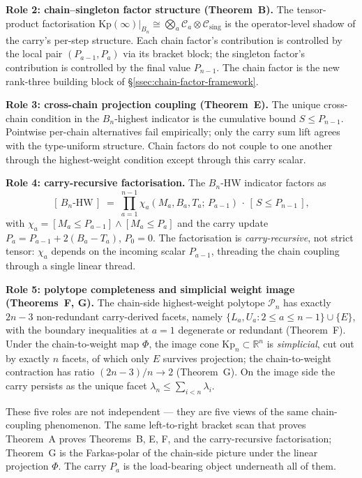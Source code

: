 \documentclass[11pt]{article}
\theoremstyle{definition}
\theoremstyle{remark}
\newcommand{\Kp}{\mathrm{Kp}}
\newcommand{\Cmid}{\mathcal{C}}
\newcommand{\Csing}{\mathcal{C}_{\mathrm{sing}}}
\newcommand{\Pn}{\mathcal{P}}
\begin{document}
\medskip
\noindent\textbf{Role 2: chain--singleton factor structure (Theorem~B).} The tensor-product
factorisation $\Kp(\infty)|_{B_n} \cong \bigotimes_a \Cmid_a \otimes \Csing$ is the
operator-level shadow of the carry's per-step structure. Each chain factor's contribution is
controlled by the local pair $(P_{a - 1}, P_a)$ via its bracket block; the singleton factor's
contribution is controlled by the final value $P_{n - 1}$. The chain factor is the new
rank-three building block of \S\ref{ssec:chain-factor-framework}.

\medskip
\noindent\textbf{Role 3: cross-chain projection coupling (Theorem~E).} The unique cross-chain
condition in the $B_n$-highest indicator is the cumulative bound $S \le P_{n - 1}$. Pointwise
per-chain alternatives fail empirically; only the carry sum lift agrees with the type-uniform
structure. Chain factors do not couple to one another through the highest-weight condition
except through this carry scalar.

\medskip
\noindent\textbf{Role 4: carry-recursive factorisation.} The $B_n$-HW indicator factors as
\[
   [\,B_n\text{-HW}\,] \;=\; \prod_{a = 1}^{n - 1} \chi_a(M_a, B_a, T_a;\, P_{a - 1})
   \,\cdot\, [\,S \le P_{n - 1}\,],
\]
with $\chi_a = [M_a \le P_{a - 1}] \wedge [M_a \le P_a]$ and the carry update $P_a = P_{a - 1}
+ 2(B_a - T_a)$, $P_0 = 0$. The factorisation is \emph{carry-recursive}, not strict tensor:
$\chi_a$ depends on the incoming scalar $P_{a - 1}$, threading the chain coupling through a
single linear thread.

\medskip
\noindent\textbf{Role 5: polytope completeness and simplicial weight image (Theorems~F, G).}
The chain-side highest-weight polytope $\Pn_n$ has exactly $2n - 3$ non-redundant
carry-derived facets, namely $\{L_a, U_a : 2 \le a \le n - 1\} \cup \{E\}$, with the boundary
inequalities at $a = 1$ degenerate or redundant (Theorem~F). Under the chain-to-weight map
$\Phi$, the image cone $\Kp_n \subset \mathbb{R}^n$ is \emph{simplicial}, cut out by exactly
$n$ facets, of which only $E$ survives projection; the chain-to-weight contraction has ratio
$(2n - 3)/n \to 2$ (Theorem~G). On the image side the carry persists as the unique facet
$\lambda_n \le \sum_{i < n} \lambda_i$.

\medskip
These five roles are not independent --- they are five views of the same chain-coupling
phenomenon. The same left-to-right bracket scan that proves Theorem~A proves Theorems~B,
E, F, and the carry-recursive factorisation; Theorem~G is the Farkas-polar of the chain-side
picture under the linear projection $\Phi$. The carry $P_a$ is the load-bearing object
underneath all of them.
\end{document}
